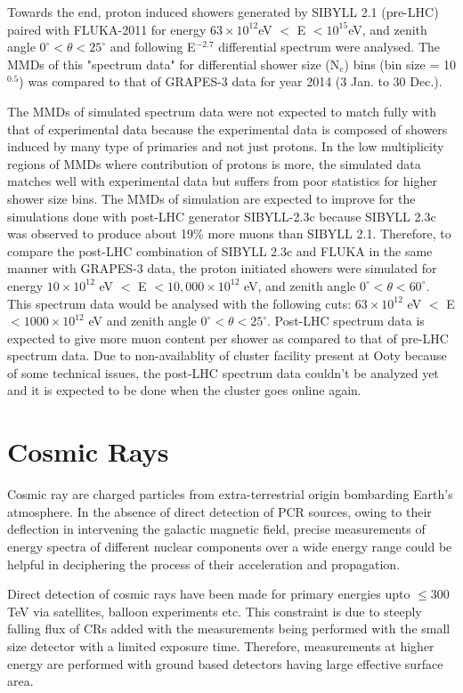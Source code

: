 \documentclass[12pt]{article}
\begin{document}
Towards the end, proton induced showers generated by SIBYLL 2.1 (pre-LHC) paired with FLUKA-2011 for energy $63\times10^{12}$eV $< $ E $< 10^{15}$eV, and zenith angle $0^\circ<\theta<25^\circ$ and following E$^{-2.7}$ differential spectrum were analysed. The MMDs of this "spectrum data" for differential shower size (N$_e$) bins (bin size = 10$^{0.5}$) was compared to that of GRAPES-3 data for year 2014 (3 Jan. to 30 Dec.).  

The MMDs of simulated spectrum data were not expected to match fully with that of experimental data because the experimental data is composed of showers induced by many type of primaries and not just protons\cite{tanaka}. In the low multiplicity regions of MMDs where contribution of  protons is more, the simulated data matches well with experimental data but suffers from poor statistics for higher shower size bins. The MMDs of simulation are expected to improve for the simulations done with post-LHC generator SIBYLL-2.3c because SIBYLL 2.3c was observed to produce about 19\% more muons than SIBYLL 2.1. Therefore, to compare the post-LHC combination of SIBYLL 2.3c and FLUKA in the same manner with GRAPES-3 data, the proton initiated showers were simulated for energy $10\times10^{12}$ eV $<$  E $<10,000\times10^{12}$ eV, and zenith angle $0^\circ<\theta<60^\circ$. This spectrum data would be analysed with the following cuts: $63\times10^{12}$ eV $<$  E $<1000\times10^{12}$ eV and zenith angle $0^\circ<\theta<25^\circ$. Post-LHC spectrum data is expected to give more muon content per shower as compared to that of pre-LHC spectrum data. Due to non-availablity of cluster facility present at Ooty because of some technical issues, the post-LHC spectrum data couldn't be analyzed yet and it is expected to be done when the cluster goes online again. 

 
\section{Cosmic Rays}
Cosmic ray are charged particles from extra-terrestrial origin bombarding Earth's atmosphere. In the absence of direct detection of PCR sources, owing to their deflection in intervening the galactic magnetic field, precise measurements of energy spectra of different nuclear components over a wide energy range could be helpful in deciphering the process of their acceleration and propagation\cite{anuj}. 

Direct detection of cosmic rays have been made for primary energies upto $\leq$300 TeV \cite{tanaka} via satellites, balloon experiments etc. This constraint is due to steeply falling flux of CRs added with the measurements being performed with the small size detector with a limited exposure time. Therefore, measurements at higher energy are performed with ground based detectors having large effective surface area. 
\end{document}
